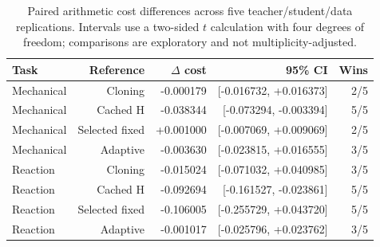 \begin{table}[htbp]\centering\small\setlength{\tabcolsep}{4pt}
\begin{tabular}{@{}lrrrr@{}}\toprule
Task & Reference & $\Delta$ cost & 95\% CI & Wins\\\midrule
Mechanical & Cloning & -0.000179 & [-0.016732, +0.016373] & 2/5\\
Mechanical & Cached H & -0.038344 & [-0.073294, -0.003394] & 5/5\\
Mechanical & Selected fixed & +0.001000 & [-0.007069, +0.009069] & 2/5\\
Mechanical & Adaptive & -0.003630 & [-0.023815, +0.016555] & 3/5\\
Reaction & Cloning & -0.015024 & [-0.071032, +0.040985] & 3/5\\
Reaction & Cached H & -0.092694 & [-0.161527, -0.023861] & 5/5\\
Reaction & Selected fixed & -0.106005 & [-0.255729, +0.043720] & 5/5\\
Reaction & Adaptive & -0.001017 & [-0.025796, +0.023762] & 3/5\\
\bottomrule\end{tabular}
\caption{Paired arithmetic cost differences across five teacher/student/data replications. Intervals use a two-sided $t$ calculation with four degrees of freedom; comparisons are exploratory and not multiplicity-adjusted.}
\end{table}
